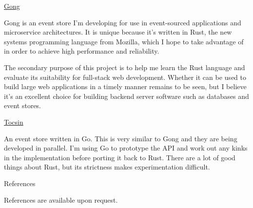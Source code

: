 \documentclass{article}
\begin{document}
    {
        \large
        \href{http://github.com/Past9/gong}{Gong}
    }

    \medskip

    Gong is an event store I'm developing for use in event-sourced applications and microservice architectures. It is unique because it's written in Rust, the new systems programming language from Mozilla, which I hope to take advantage of in order to achieve high performance and reliability.

    \smallskip

    The secondary purpose of this project is to help me learn the Rust language and evaluate its suitability for full-stack web development. Whether it can be used to build large web applications in a timely manner remains to be seen, but I believe it's an excellent choice for building backend server software such as databases and event stores.

    \bigskip\bigskip

    {
        \large
        \href{http://github.com/Past9/tocsin}{Tocsin}
    }

    \medskip

    An event store written in Go. This is very similar to Gong and they are being developed in parallel. I'm using Go to prototype the API and work out any kinks in the implementation before porting it back to Rust. There are a lot of good things about Rust, but its strictness makes experimentation difficult.


    \bigskip\bigskip\bigskip

    {
        \noindent\Large
        References
    }

    \noindent\makebox[\linewidth]{\rule{\textwidth}{0.4pt}}
    \medskip

    References are available upon request.
\end{document}
